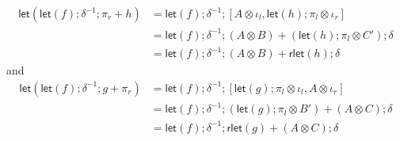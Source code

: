 \documentclass[acmsmall,screen,review]{acmart}
\newcommand{\ms}[1]{\ensuremath{\mathsf{#1}}}
\newcommand{\lmor}[1]{\ms{let}(#1)}
\newcommand{\rlmor}[1]{\ms{rlet}(#1)}
\begin{document}
\begin{lemma}
\begin{enumerate}[label=(\alph*)]
\begin{equation}
\begin{aligned}
      \lmor{\lmor{f} ; \delta^{-1} ; \pi_r + h}
      &= \lmor{f} ; \delta^{-1} 
        ; [A \otimes \iota_l, \lmor{h} ; \pi_l \otimes \iota_r] \\
      &= \lmor{f} ; \delta^{-1} 
        ; (A \otimes B) + (\lmor{h} ; \pi_l \otimes C')
        ; \delta\\
      &= \lmor{f} ; \delta^{-1} 
        ; (A \otimes B) + \rlmor{h}
        ; \delta
      \end{aligned}
    \end{equation}
    and
    \begin{equation}
      \begin{aligned}
      \lmor{\lmor{f} ; \delta^{-1} ; g + \pi_r}
      &= \lmor{f} ; \delta^{-1} 
        ; [\lmor{g} ; \pi_l \otimes \iota_l, A \otimes \iota_r] \\
      &= \lmor{f} ; \delta^{-1} 
        ; (\lmor{g} ; \pi_l \otimes B') + (A \otimes C)
        ; \delta \\
      &= \lmor{f} ; \delta^{-1} 
        ; \rlmor{g} + (A \otimes C)
        ; \delta
      \end{aligned}
    \end{equation}
  \end{enumerate}
\end{lemma}
\end{document}

